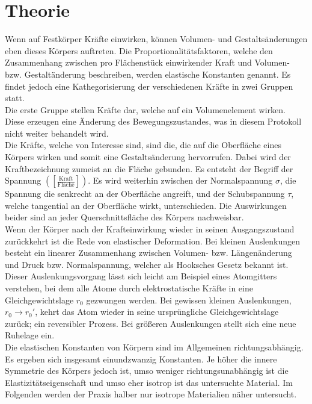 \section{Theorie}
\label{sec:Theorie}
Wenn auf Festkörper Kräfte einwirken, können Volumen- und Gestaltsänderungen eben dieses Körpers auftreten.
Die Proportionalitätsfaktoren, welche den Zusammenhang zwischen pro Flächenstück einwirkender Kraft und Volumen- bzw. Gestaltänderung beschreiben, werden elastische Konstanten genannt.
Es findet jedoch eine Kathegorisierung der verschiedenen Kräfte in zwei Gruppen statt.\\
Die erste Gruppe stellen Kräfte dar, welche auf ein Volumenelement wirken.
Diese erzeugen eine Änderung des Bewegungszustandes, was in diesem Protokoll nicht weiter behandelt wird.\\
Die Kräfte, welche von Interesse sind, sind die, die auf die Oberfläche eines Körpers wirken und somit eine Gestaltsänderung hervorrufen.
Dabei wird der Kraftbezeichnung zumeist an die Fläche gebunden.
Es entsteht der Begriff der Spannung $([\frac{\text{Kraft}}{\text{Fläche}}])$.
Es wird weiterhin zwischen der Normalspannung $\sigma$, die Spannung die senkrecht an der Oberfläche angreift, und der Schubspannung $\tau$, welche tangential an der Oberfläche wirkt, unterschieden.
Die Auswirkungen beider sind an jeder Querschnittsfläche des Körpers nachweisbar.\\
Wenn der Körper nach der Krafteinwirkung wieder in seinen Ausgangszustand zurückkehrt ist die Rede von elastischer Deformation.
Bei kleinen Auslenkungen besteht ein linearer Zusammenhang zwischen Volumen- bzw. Längenänderung und Druck bzw. Normalspannung, welcher als Hooksches Gesetz bekannt ist.
Dieser Auslenkungsvorgang lässt sich leicht am Beispiel eines Atomgitters verstehen, bei dem alle Atome durch elektrostatische Kräfte in eine Gleichgewichtslage $r_0$ gezwungen werden.
Bei gewissen kleinen Auslenkungen, $r_0 \rightarrow r_0'$, kehrt das Atom wieder in seine ursprüngliche Gleichgewichtslage zurück; ein reversibler Prozess.
Bei größeren Auslenkungen stellt sich eine neue Ruhelage ein.\\
Die elastischen Konstanten von Körpern sind im Allgemeinen richtungsabhängig.
Es ergeben sich insgesamt einundzwanzig Konstanten.
Je höher die innere Symmetrie des Körpers jedoch ist, umso weniger richtungsunabhängig ist die Elastizitätseigenschaft und umso eher isotrop ist das untersuchte Material.
Im Folgenden werden der Praxis halber nur isotrope Materialien näher untersucht.\\
